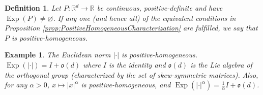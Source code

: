 \documentclass[11pt]{article}
\newtheorem{definition}[theorem]{Definition}
\newtheorem{example}{Example}
\theoremstyle{remark}
\newcommand\Exp{\operatorname{Exp}}
\begin{document}
\begin{definition}
Let $P:\mathbb{R}^d\to\mathbb{R}$ be continuous, positive-definite and have $\Exp(P)\neq \varnothing$. If any one (and hence all) of the equivalent conditions in Proposition \ref{prop:PositiveHomogeneousCharacterization} are fulfilled, we say that $P$ is positive-homogeneous.
\end{definition}



\begin{example}\label{exp:EuclideanNorm}\normalfont
The Euclidean norm $|\cdot|$ is positive-homogeneous. $\Exp(|\cdot|)=I+\mathfrak{o}(d)$ where $I$ is the identity and $\mathfrak{o}(d)$ is the Lie algebra of the orthogonal group (characterized by the set of skew-symmetric matrices). Also, for any $\alpha>0$, $x\mapsto |x|^\alpha$ is positive-homogeneous, and $\Exp(|\cdot|^{\alpha})=\frac{1}{\alpha}I+\mathfrak{o}(d)$.
\end{example}
\end{document}
